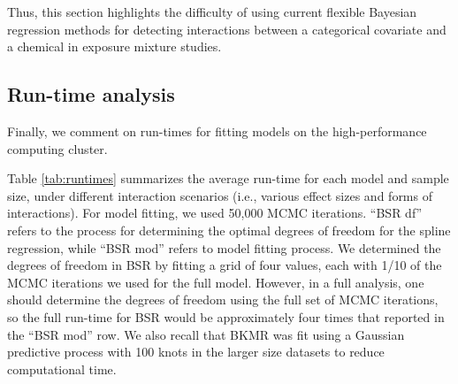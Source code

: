 \documentclass[12pt, twoside]{amherstthesis}
\begin{document}
Thus, this section highlights the difficulty of using current flexible Bayesian regression methods for detecting interactions between a categorical covariate and a chemical in exposure mixture studies.

\hypertarget{run-time-analysis}{%
\subsection{Run-time analysis}\label{run-time-analysis}}

Finally, we comment on run-times for fitting models on the high-performance computing cluster.

Table \ref{tab:runtimes} summarizes the average run-time for each model and sample size, under different interaction scenarios (i.e., various effect sizes and forms of interactions). For model fitting, we used 50,000 MCMC iterations. ``BSR df'' refers to the process for determining the optimal degrees of freedom for the spline regression, while ``BSR mod'' refers to model fitting process. We determined the degrees of freedom in BSR by fitting a grid of four values, each with 1/10 of the MCMC iterations we used for the full model. However, in a full analysis, one should determine the degrees of freedom using the full set of MCMC iterations, so the full run-time for BSR would be approximately four times that reported in the ``BSR mod'' row. We also recall that BKMR was fit using a Gaussian predictive process with 100 knots in the larger size datasets to reduce computational time.
\end{document}
